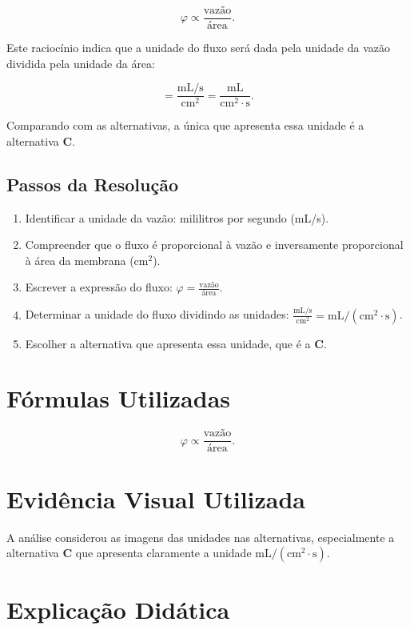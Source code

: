 \documentclass{article}
\begin{document}
\begin{equation}
\varphi \propto \frac{\text{vazão}}{\text{área}}.
\end{equation}

Este raciocínio indica que a unidade do fluxo será dada pela unidade da vazão dividida pela unidade da área:

\begin{equation}
[\varphi] = \frac{\mathrm{mL/s}}{\mathrm{cm}^2} = \mathrm{\frac{mL}{cm^2 \cdot s}}.
\end{equation}

Comparando com as alternativas, a única que apresenta essa unidade é a alternativa \textbf{C}.

\subsection*{Passos da Resolução}
\begin{enumerate}
  \item Identificar a unidade da vazão: mililitros por segundo (mL/s).
  \item Compreender que o fluxo é proporcional à vazão e inversamente proporcional à área da membrana (cm$^2$).
  \item Escrever a expressão do fluxo: $\varphi = \frac{\text{vazão}}{\text{área}}$.
  \item Determinar a unidade do fluxo dividindo as unidades: $\frac{\mathrm{mL/s}}{\mathrm{cm}^2} = \mathrm{mL/(cm^2 \cdot s)}$.
  \item Escolher a alternativa que apresenta essa unidade, que é a \textbf{C}.
\end{enumerate}

\section*{Fórmulas Utilizadas}
\begin{equation}
\varphi \propto \frac{\text{vazão}}{\text{área}}.
\end{equation}

\section*{Evidência Visual Utilizada}
A análise considerou as imagens das unidades nas alternativas, especialmente a alternativa \textbf{C} que apresenta claramente a unidade $\mathrm{mL/(cm^2 \cdot s)}$.

\section{Explicação Didática}
\end{document}
